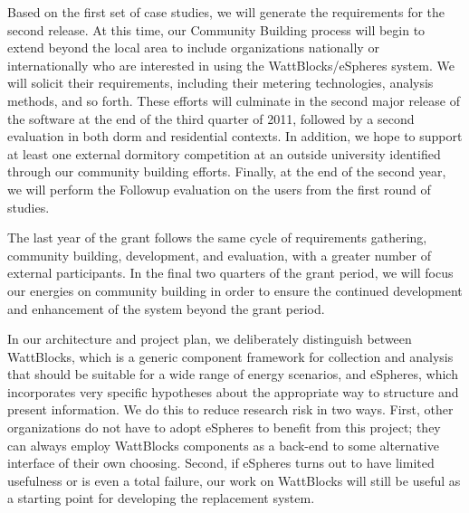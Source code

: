 Based on the first set of case studies, we will generate the requirements
for the second release.  At this time, our Community Building process will
begin to extend beyond the local area to include organizations nationally
or internationally who are interested in using the WattBlocks/eSpheres
system.  We will solicit their requirements, including their metering
technologies, analysis methods, and so forth.  These efforts will culminate
in the second major release of the software at the end of the third quarter
of 2011, followed by a second evaluation in both dorm and residential
contexts. In addition, we hope to support at least one external dormitory
competition at an outside university identified through our community
building efforts.  Finally, at the end of the second year, we will perform
the Followup evaluation on the users from the first round of studies.

The last year of the grant follows the same cycle of requirements
gathering, community building, development, and evaluation, with a greater
number of external participants.  In the final two quarters of the grant
period, we will focus our energies on community building in order to ensure
the continued development and enhancement of the system beyond the grant
period.


In our architecture and project plan, we deliberately distinguish between
WattBlocks, which is a generic component framework for collection and
analysis that should be suitable for a wide range of energy scenarios, and
eSpheres, which incorporates very specific hypotheses about the appropriate
way to structure and present information.  We do this to reduce research
risk in two ways. First, other organizations do not have to adopt eSpheres
to benefit from this project; they can always employ WattBlocks components
as a back-end to some alternative interface of their own choosing.  Second,
if eSpheres turns out to have limited usefulness or is even a total
failure, our work on WattBlocks will still be useful as a starting point
for developing the replacement system.

